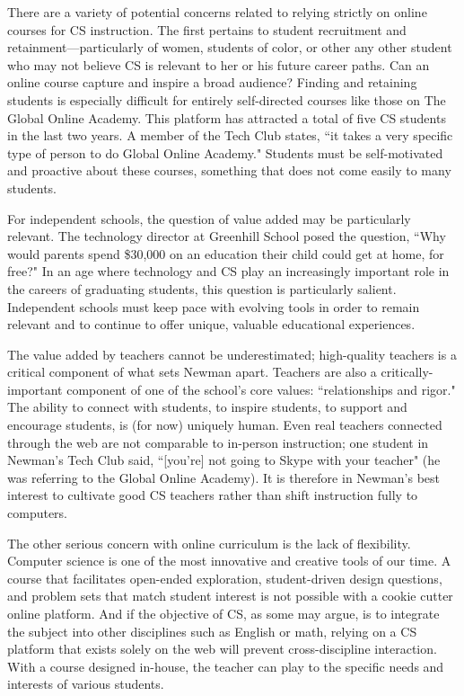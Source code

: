 There are a variety of potential concerns related to relying strictly on online courses for CS instruction. The first pertains to student recruitment and retainment---particularly of women, students of color, or other any other student who may not believe CS is relevant to her or his future career paths. Can an online course capture and inspire a broad audience? Finding and retaining students is especially difficult for entirely self-directed courses like those on The Global Online Academy. This platform has attracted a total of five CS students in the last two years. A member of the Tech Club states, ``it takes a very specific type of person to do Global Online Academy." Students must be self-motivated and proactive about these courses, something that does not come easily to many students.\par
For independent schools, the question of value added may be particularly relevant. The technology director at Greenhill School posed the question, ``Why would parents spend \$30,000 on an education their child could get at home, for free?" In an age where technology and CS play an increasingly important role in the careers of graduating students, this question is particularly salient. Independent schools must keep pace with evolving tools in order to remain relevant and to continue to offer unique, valuable educational experiences. \par
The value added by teachers cannot be underestimated; high-quality teachers is a critical component of what sets Newman apart. Teachers are also a critically-important component of one of the school's core values: ``relationships and rigor." The ability to connect with students, to inspire students, to support and encourage students, is (for now) uniquely human. Even real teachers connected through the web are not comparable to in-person instruction; one student in Newman's Tech Club said, ``[you're] not going to Skype with your teacher" (he was referring to the Global Online Academy). It is therefore in Newman's best interest to cultivate good CS teachers rather than shift instruction fully to computers.\par
 The other serious concern with online curriculum is the lack of flexibility. Computer science is one of the most innovative and creative tools of our time. A course that facilitates open-ended exploration, student-driven design questions, and problem sets that match student interest is not possible with a cookie cutter online platform. And if the objective of CS, as some may argue, is to integrate the subject into other disciplines such as English or math, relying on a CS platform that exists solely on the web will prevent cross-discipline interaction. With a course designed in-house, the teacher can play to the specific needs and interests of various students.\par 
